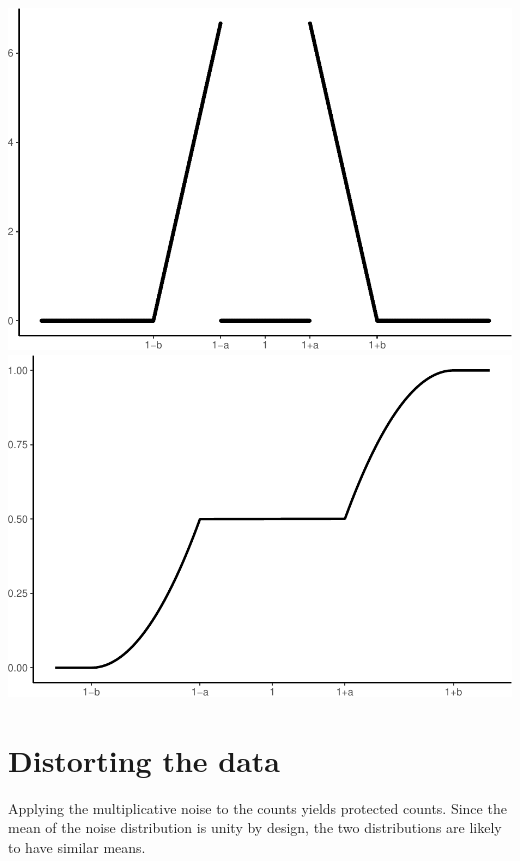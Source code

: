 \documentclass[]{article}
\newenvironment{Shaded}{\begin{snugshade}}{\end{snugshade}}
\newcommand{\KeywordTok}[1]{\textcolor[rgb]{0.13,0.29,0.53}{\textbf{{#1}}}}
\newcommand{\DecValTok}[1]{\textcolor[rgb]{0.00,0.00,0.81}{{#1}}}
\newcommand{\FloatTok}[1]{\textcolor[rgb]{0.00,0.00,0.81}{{#1}}}
\newcommand{\StringTok}[1]{\textcolor[rgb]{0.31,0.60,0.02}{{#1}}}
\newcommand{\NormalTok}[1]{{#1}}
\begin{document}
\includegraphics{rampdist_files/figure-latex/plot_ramp-1.pdf}
\includegraphics{rampdist_files/figure-latex/plot_cum_ramp-1.pdf}

\section{Distorting the data}\label{distorting-the-data}

Applying the multiplicative noise to the counts yields protected counts.
Since the mean of the noise distribution is unity by design, the two
distributions are likely to have similar means.

\begin{Shaded}
\end{Shaded}
\end{document}
